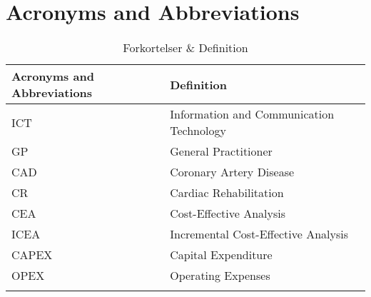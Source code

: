 \chapter{Acronyms and Abbreviations}


\begin{longtabu} to 
	\textbf{Acronyms and Abbreviations} & \textbf{Definition}\\[-1ex]
	\midrule
	ICT & Information and Communication Technology \\[-1ex]
	GP & General Practitioner \\[-1ex]
	CAD & Coronary Artery Disease \\[-1ex]
	CR & Cardiac Rehabilitation \\[-1ex]
	CEA & Cost-Effective Analysis \\[-1ex]
	ICEA & Incremental Cost-Effective Analysis \\[-1ex]
	CAPEX & Capital Expenditure \\[-1ex]
	OPEX & Operating Expenses \\[-1ex]
	\caption{Forkortelser \& Definition}
\end{longtabu}


